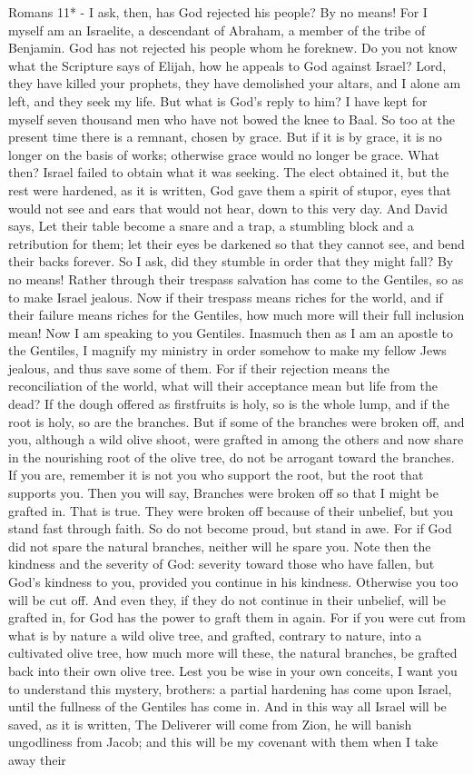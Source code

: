 \documentclass[11pt]{article}
\begin{document}
Romans 11* - I ask, then, has God rejected his people? By no means! For I myself am an Israelite, a descendant of Abraham, a member of the tribe of Benjamin. God has not rejected his people whom he foreknew. Do you not know what the Scripture says of Elijah, how he appeals to God against Israel? Lord, they have killed your prophets, they have demolished your altars, and I alone am left, and they seek my life. But what is God's reply to him? I have kept for myself seven thousand men who have not bowed the knee to Baal. So too at the present time there is a remnant, chosen by grace. But if it is by grace, it is no longer on the basis of works; otherwise grace would no longer be grace. What then? Israel failed to obtain what it was seeking. The elect obtained it, but the rest were hardened, as it is written, God gave them a spirit of stupor, eyes that would not see and ears that would not hear, down to this very day. And David says, Let their table become a snare and a trap, a stumbling block and a retribution for them; let their eyes be darkened so that they cannot see, and bend their backs forever. So I ask, did they stumble in order that they might fall? By no means! Rather through their trespass salvation has come to the Gentiles, so as to make Israel jealous. Now if their trespass means riches for the world, and if their failure means riches for the Gentiles, how much more will their full inclusion mean! Now I am speaking to you Gentiles. Inasmuch then as I am an apostle to the Gentiles, I magnify my ministry in order somehow to make my fellow Jews jealous, and thus save some of them. For if their rejection means the reconciliation of the world, what will their acceptance mean but life from the dead? If the dough offered as firstfruits is holy, so is the whole lump, and if the root is holy, so are the branches. But if some of the branches were broken off, and you, although a wild olive shoot, were grafted in among the others and now share in the nourishing root of the olive tree, do not be arrogant toward the branches. If you are, remember it is not you who support the root, but the root that supports you. Then you will say, Branches were broken off so that I might be grafted in. That is true. They were broken off because of their unbelief, but you stand fast through faith. So do not become proud, but stand in awe. For if God did not spare the natural branches, neither will he spare you. Note then the kindness and the severity of God: severity toward those who have fallen, but God's kindness to you, provided you continue in his kindness. Otherwise you too will be cut off. And even they, if they do not continue in their unbelief, will be grafted in, for God has the power to graft them in again. For if you were cut from what is by nature a wild olive tree, and grafted, contrary to nature, into a cultivated olive tree, how much more will these, the natural branches, be grafted back into their own olive tree. Lest you be wise in your own conceits, I want you to understand this mystery, brothers: a partial hardening has come upon Israel, until the fullness of the Gentiles has come in. And in this way all Israel will be saved, as it is written, The Deliverer will come from Zion, he will banish ungodliness from Jacob; and this will be my covenant with them when I take away their 
\end{document}
